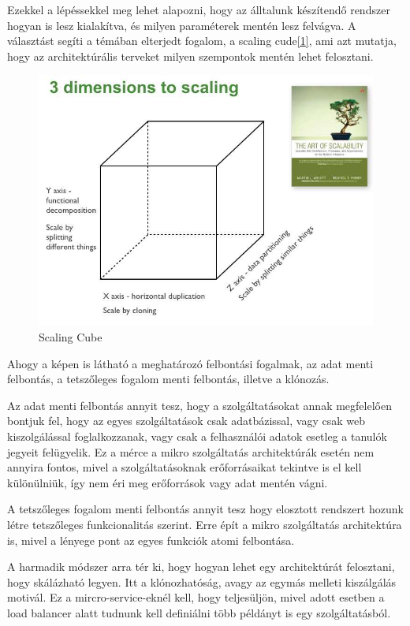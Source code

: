 \documentclass[11pt,magyar,a4paper,oneside,]{report}
\let\Oldincludegraphics\includegraphics
\renewcommand{\includegraphics}[1]{
\begin{adjustbox}{max size={\textwidth}{\textheight}}
    \Oldincludegraphics[scale=0.6]{#1}%
\end{adjustbox}
}
\begin{document}
Ezekkel a lépéssekkel meg lehet alapozni, hogy az álltalunk készítendő
rendszer hogyan is lesz kialakítva, és milyen paraméterek mentén lesz
felvágva. A választást segíti a témában elterjedt fogalom, a scaling
cude\href{http://microservices.io/articles/scalecube.html}{{[}1{]}}, ami
azt mutatja, hogy az architektúrális terveket milyen szempontok mentén
lehet felosztani.

\begin{figure}[htbp]
\centering
\includegraphics{img/ScaleCude.jpg}
\caption{Scaling Cube}
\end{figure}

Ahogy a képen is látható a meghatározó felbontási fogalmak, az adat
menti felbontás, a tetszőleges fogalom menti felbontás, illetve a
klónozás.

Az adat menti felbontás annyit tesz, hogy a szolgáltatásokat annak
megfelelően bontjuk fel, hogy az egyes szolgáltatások csak adatbázissal,
vagy csak web kiszolgálással foglalkozzanak, vagy csak a felhasználói
adatok esetleg a tanulók jegyeit felügyelik. Ez a mérce a mikro
szolgáltatás architektúrák esetén nem annyira fontos, mivel a
szolgáltatásoknak erőforrásaikat tekintve is el kell különülniük, így
nem éri meg erőforrások vagy adat mentén vágni.

A tetszőleges fogalom menti felbontás annyit tesz hogy elosztott
rendszert hozunk létre tetszőleges funkcionalitás szerint. Erre épít a
mikro szolgáltatás architektúra is, mivel a lényege pont az egyes
funkciók atomi felbontása.

A harmadik módszer arra tér ki, hogy hogyan lehet egy architektúrát
felosztani, hogy skálázható legyen. Itt a klónozhatóság, avagy az egymás
melleti kiszálgálás motivál. Ez a mircro-service-eknél kell, hogy
teljesüljön, mivel adott esetben a load balancer alatt tudnunk kell
definiálni több példányt is egy szolgáltatásból.
\end{document}
